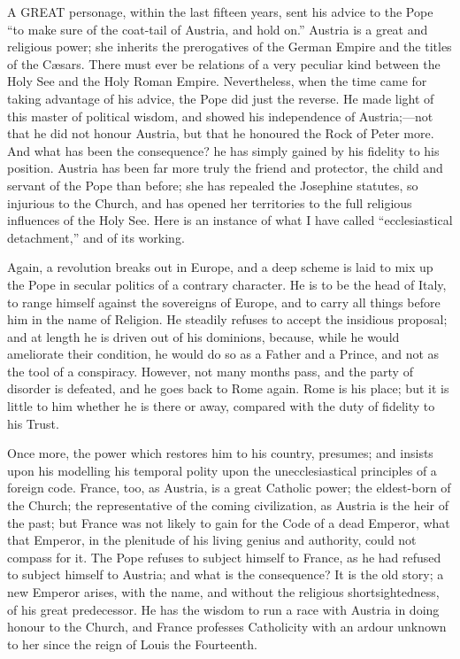 
A GREAT personage, within the last
fifteen years, sent his advice to the Pope ``to make sure of the
coat-tail of Austria, and hold on.'' Austria is a great and
religious power; she inherits the prerogatives of the German Empire
and the titles of the Cæsars. There must ever be relations of a very
peculiar kind between the Holy See and the Holy Roman Empire.
Nevertheless, when the time came for taking advantage of his advice,
the Pope did just the reverse. He made light of this master of
political wisdom, and showed his independence of Austria;—not that
he did not honour Austria, but that he honoured the Rock of Peter
more. And what has been the consequence? he has simply gained by his
fidelity to his position. Austria has been far more truly the friend
and protector, the child and servant of the Pope than before; she has
repealed the Josephine statutes, so injurious to the Church, and has
opened her territories to the full religious influences of the Holy
See. Here is an instance of what I have called ``ecclesiastical
detachment,'' and of its working.

Again, a revolution breaks out in Europe, and a deep scheme is laid
to mix up the Pope in secular politics of a contrary character. He is
to be the head of Italy, to range himself against the sovereigns of
Europe, and to carry all things before him in the name of
Religion. He steadily refuses to accept the insidious proposal; and at
length he is driven out of his dominions, because, while he would
ameliorate their condition, he would do so as a Father and a Prince,
and not as the tool of a conspiracy. However, not many months pass,
and the party of disorder is defeated, and he goes back to Rome again.
Rome is his place; but it is little to him whether he is there or
away, compared with the duty of fidelity to his Trust.

Once more, the power which restores him to his country, presumes;
and insists upon his modelling his temporal polity upon the
unecclesiastical principles of a foreign code. France, too, as
Austria, is a great Catholic power; the eldest-born of the Church; the
representative of the coming civilization, as Austria is the heir of
the past; but France was not likely to gain for the Code of a dead
Emperor, what that Emperor, in the plenitude of his living genius and
authority, could not compass for it. The Pope refuses to subject
himself to France, as he had refused to subject himself to Austria;
and what is the consequence? It is the old story; a new Emperor
arises, with the name, and without the religious shortsightedness, of
his great predecessor. He has the wisdom to run a race with Austria in
doing honour to the Church, and France professes Catholicity with an
ardour unknown to her since the reign of Louis the Fourteenth.

